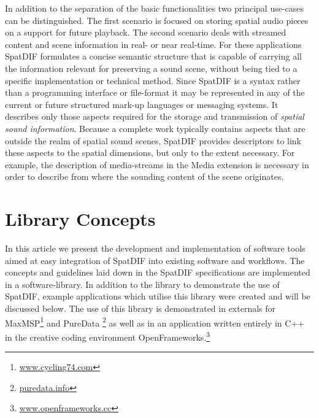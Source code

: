 \documentclass{article}
\begin{document}
In addition to the separation of the basic functionalities two principal use-cases can be distinguished.
The first scenario is focused on storing spatial audio pieces on a support for future playback. 
The second scenario deals with streamed content and scene information in real- or near real-time.
For these applications SpatDIF formulates a concise semantic structure that is capable of carrying all the information relevant for preserving a sound scene, without being tied to a specific implementation or technical method.
Since SpatDIF is a syntax rather than a programming interface or file-format it may be represented in any of the current or future structured mark-up languages or messaging systems.
It describes only those aspects required for the storage and transmission of \emph{spatial sound information}.
Because a complete work typically contains aspects that are outside the realm of spatial sound scenes, SpatDIF provides descriptors to link these aspects to the spatial dimensions, but only to the extent necessary.
For example, the description of media-streams in the Media extension is necessary in order to describe from where the sounding content of the scene originates.

\section{Library Concepts}\label{sec:libspatdif_concepts}

In this article we present the development and implementation of software tools aimed at easy integration of SpatDIF into existing software and workflows.
The concepts and guidelines laid down in the SpatDIF specifications are implemented in a software-library.
In addition to the library to demonstrate the use of SpatDIF, example applications which utilise this library were created and will be discussed below.
The use of this library is demonstrated in externals for MaxMSP\footnote{\href{http://www.cycling74.com}{www.cycling74.com}} and PureData \footnote{\href{http://puredata.info}{puredata.info}} as well as in an application written entirely in C++ in the creative coding environment OpenFrameworks.\footnote{\href{http://www.openframeworks.cc}{www.openframeworks.cc}}
\end{document}

